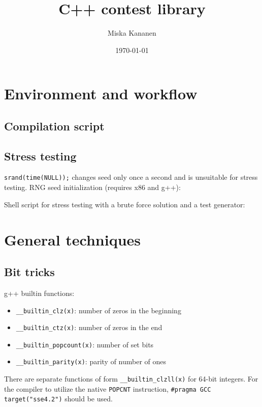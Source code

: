 \documentclass{article}
\begin{document}
\title{C++ contest library}
\author{Miska Kananen}
\date{\today}
\maketitle 

\tableofcontents

\section{Environment and workflow}
\subsection{Compilation script}


\subsection{Stress testing}

\texttt{srand(time(NULL));} changes seed only once a second and is unsuitable for stress testing. RNG seed initialization (requires x86 and g++):



Shell script for stress testing with a brute force solution and a test generator:



\section{General techniques}
\subsection{Bit tricks}

g++ builtin functions:
\begin{itemize}
	\item \verb|__builtin_clz(x)|: number of zeros in the beginning
	\item \verb|__builtin_ctz(x)|: number of zeros in the end
	\item \verb|__builtin_popcount(x)|: number of set bits
	\item \verb|__builtin_parity(x)|: parity of number of ones
\end{itemize}

There are separate functions of form \verb|__builtin_clzll(x)| for 64-bit integers. For the compiler to utilize the native \texttt{POPCNT} instruction, \texttt{\#pragma GCC target("sse4.2")} should be used.
\end{document}
